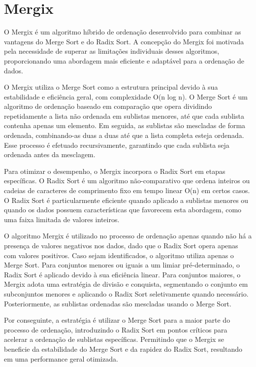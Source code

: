 \documentclass[12pt]{article}
\begin{document}
\section{Mergix} \label{sec:firstpage}

O Mergix é um algoritmo híbrido de ordenação desenvolvido para combinar as vantagens do Merge Sort e do Radix Sort. A concepção do Mergix foi motivada pela necessidade de superar as limitações individuais desses algoritmos, proporcionando uma abordagem mais eficiente e adaptável para a ordenação de dados.

O Mergix utiliza o Merge Sort como a estrutura principal devido à sua estabilidade e eficiência geral, com complexidade O(n log n). O Merge Sort é um algoritmo de ordenação baseado em comparação que opera dividindo repetidamente a lista não ordenada em sublistas menores, até que cada sublista contenha apenas um elemento. Em seguida, as sublistas são mescladas de forma ordenada, combinando-as duas a duas até que a lista completa esteja ordenada. Esse processo é efetuado recursivamente, garantindo que cada sublista seja ordenada antes da mesclagem.

Para otimizar o desempenho, o Mergix incorpora o Radix Sort em etapas específicas. O Radix Sort é um algoritmo não-comparativo que ordena inteiros ou cadeias de caracteres de comprimento fixo em tempo linear O(n) em certos casos. O Radix Sort é particularmente eficiente quando aplicado a sublistas menores ou quando os dados possuem características que favorecem esta abordagem, como uma faixa limitada de valores inteiros.

O algoritmo Mergix é utilizado no processo de ordenação apenas quando não há a presença de valores negativos nos dados, dado que o Radix Sort opera apenas com valores positivos. Caso sejam identificados, o algoritmo utiliza apenas o Merge Sort. Para conjuntos menores ou iguais a um limiar pré-determinado, o Radix Sort é aplicado devido à sua eficiência linear. Para conjuntos maiores, o Mergix adota uma estratégia de divisão e conquista, segmentando o conjunto em subconjuntos menores e aplicando o Radix Sort seletivamente quando necessário. Posteriormente, as sublistas ordenadas são mescladas usando o Merge Sort.

Por conseguinte, a estratégia é utilizar o Merge Sort para a maior parte do processo de ordenação, introduzindo o Radix Sort em pontos críticos para acelerar a ordenação de sublistas específicas. Permitindo que o Mergix se beneficie da estabilidade do Merge Sort e da rapidez do Radix Sort, resultando em uma performance geral otimizada.
\end{document}

